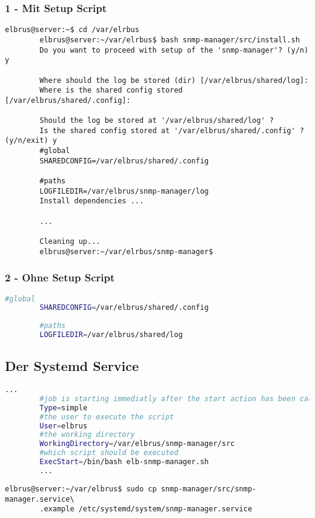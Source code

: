 \documentclass{article}
\begin{document}
	\subsubsection{1 - Mit Setup Script}
	\lstset{style=commands}
	\begin{lstlisting}[caption={Ausführen des 'install.sh' Scripts.}]
		elbrus@server:~$ cd /var/elrbus
		elbrus@server:~/var/elrbus$ bash snmp-manager/src/install.sh
		Do you want to proceed with setup of the 'snmp-manager'? (y/n) y
		
		Where should the log be stored (dir) [/var/elbrus/shared/log]:
		Where is the shared config stored [/var/elbrus/shared/.config]:
		
		Should the log be stored at '/var/elbrus/shared/log' ?
		Is the shared config stored at '/var/elbrus/shared/.config' ? (y/n/exit) y
		#global
		SHAREDCONFIG=/var/elbrus/shared/.config
		
		#paths
		LOGFILEDIR=/var/elbrus/snmp-manager/log
		Install dependencies ...
		
		...
		
		Cleaning up...
		elbrus@server:~/var/elrbus/snmp-manager$
	\end{lstlisting}
	
	\subsubsection{2 - Ohne Setup Script}
	\lstset{style=files}
	\begin{lstlisting}[caption={Anhand von '.env.example' eigene '.env' Datei anlegen.}, language=bash, keywords={CONFIGPATH, MAINPATH}, keywordstyle=\color{red}, firstnumber=17]
		#global
		SHAREDCONFIG=/var/elbrus/shared/.config
		
		#paths
		LOGFILEDIR=/var/elbrus/shared/log
	\end{lstlisting}
	
	\newpage
	\subsection[systemd service]{Der Systemd Service}
	\lstset{style=files}
	\begin{lstlisting}[caption={snmp-manager.service.example - Die Variable 'WorkingDirectory' sowie die Variable 'User' anpassen.},language=bash ,keywords={WorkingDirectory, User}, keywordstyle=\color{red}, firstnumber=5]
		...
		#job is starting immediatly after the start action has been called
		Type=simple
		#the user to execute the script
		User=elbrus
		#the working directory
		WorkingDirectory=/var/elbrus/snmp-manager/src
		#which script should be executed
		ExecStart=/bin/bash elb-snmp-manager.sh
		...
	\end{lstlisting}
	\lstset{style=commands}
	\begin{lstlisting}[caption={Kopieren des Serviceprogrammes.}]
		elbrus@server:~/var/elbrus$ sudo cp snmp-manager/src/snmp-manager.service\
		.example /etc/systemd/system/snmp-manager.service
	\end{lstlisting}
	
\end{document}

